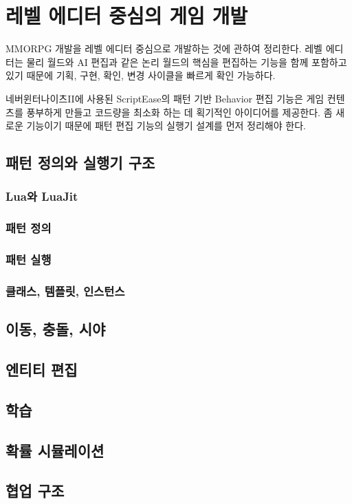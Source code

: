 \documentclass[chapter,kosection, 10.5pt, romanfixed, a4paper]{oblivoir}
\begin{document}
\section{레벨 에디터 중심의 게임 개발}

MMORPG 개발을 레벨 에디터 중심으로 개발하는 것에 관하여 정리한다. 레벨 에디터는 물리 월드와 
AI 편집과 같은 논리 월드의 핵심을 편집하는 기능을 함께 포함하고 있기 때문에 기획, 구현, 확인, 변경
사이클을 빠르게 확인 가능하다. 

네버윈터나이츠II에 사용된 ScriptEase의 패턴 기반 Behavior 편집 기능은 게임 컨텐츠를 풍부하게 만들고 
코드량을 최소화 하는 데 획기적인 아이디어를 제공한다. 좀 새로운 기능이기 때문에 
패턴 편집 기능의 실행기 설계를 먼저 정리해야 한다. 

\subsection{패턴 정의와 실행기 구조}

\subsubsection{Lua와 LuaJit}


\subsubsection{패턴 정의}


\subsubsection{패턴 실행}


\subsubsection{클래스, 템플릿, 인스턴스}



\subsection{이동, 충돌, 시야}

\subsection{엔티티 편집}

\subsection{학습}

\subsection{확률 시뮬레이션}

\subsection{협업 구조}
\end{document}
